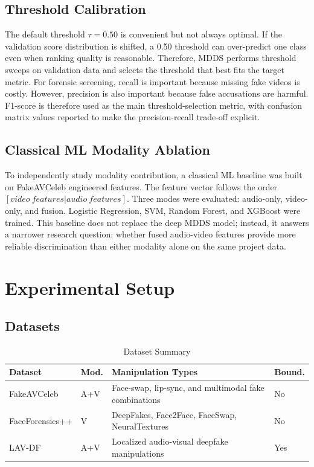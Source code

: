 \documentclass[conference]{IEEEtran}
\begin{document}
\subsection{Threshold Calibration}
The default threshold $\tau=0.50$ is convenient but not always optimal. If the validation score distribution is shifted, a 0.50 threshold can over-predict one class even when ranking quality is reasonable. Therefore, MDDS performs threshold sweeps on validation data and selects the threshold that best fits the target metric. For forensic screening, recall is important because missing fake videos is costly. However, precision is also important because false accusations are harmful. F1-score is therefore used as the main threshold-selection metric, with confusion matrix values reported to make the precision-recall trade-off explicit.

\subsection{Classical ML Modality Ablation}
To independently study modality contribution, a classical ML baseline was built on FakeAVCeleb engineered features. The feature vector follows the order $[video\ features | audio\ features]$. Three modes were evaluated: audio-only, video-only, and fusion. Logistic Regression, SVM, Random Forest, and XGBoost were trained. This baseline does not replace the deep MDDS model; instead, it answers a narrower research question: whether fused audio-video features provide more reliable discrimination than either modality alone on the same project data.

\section{Experimental Setup}
\subsection{Datasets}
\begin{table}[htbp]
\caption{Dataset Summary}
\centering
\begin{tabular}{p{1.55cm}p{1.15cm}p{2.6cm}p{0.85cm}}
\toprule
Dataset & Mod. & Manipulation Types & Bound. \\
\midrule
FakeAVCeleb & A+V & Face-swap, lip-sync, and multimodal fake combinations & No \\
FaceForensics++ & V & DeepFakes, Face2Face, FaceSwap, NeuralTextures & No \\
LAV-DF & A+V & Localized audio-visual deepfake manipulations & Yes \\
\bottomrule
\end{tabular}
\end{table}
\end{document}
